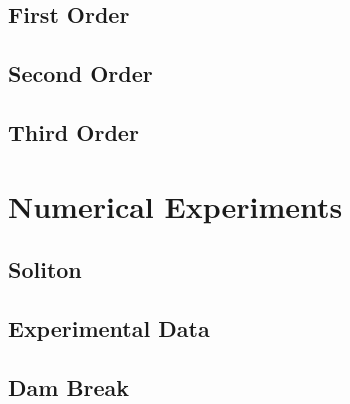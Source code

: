 \documentclass{article}
\begin{document}
  \subsection{First Order}
  \subsection{Second Order}
  \subsection{Third Order}
  \section{Numerical Experiments}
  \subsection{Soliton}
  \subsection{Experimental Data}
  \subsection{Dam Break}
  \cite{Kurganov2001}

 
  
\end{document}
